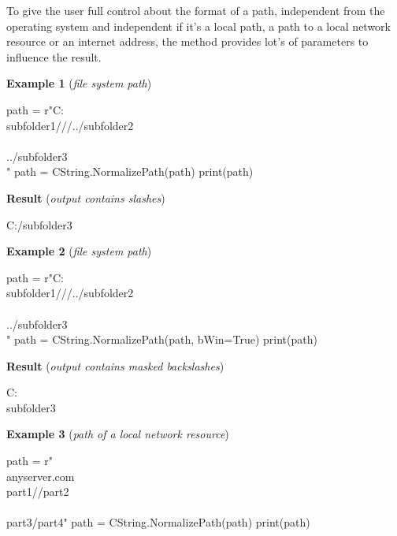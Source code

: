 To give the user full control about the format of a path, independent from the operating system and independent if it's
a local path, a path to a local network resource or an internet address, the method  provides
lot's of parameters to influence the result.

\vspace{1ex}

\textbf{Example 1} (\textit{file system path})

\begin{pythoncode}
path = r"C:\\subfolder1///../subfolder2\\\\../subfolder3\\"
path = CString.NormalizePath(path)
print(path)
\end{pythoncode}

\textbf{Result} (\textit{output contains slashes})

\begin{robotlog}
C:/subfolder3
\end{robotlog}

\vspace{1ex}

\textbf{Example 2} (\textit{file system path})

\begin{pythoncode}
path = r"C:\\subfolder1///../subfolder2\\\\../subfolder3\\"
path = CString.NormalizePath(path, bWin=True)
print(path)
\end{pythoncode}

\textbf{Result} (\textit{output contains masked backslashes})

\begin{robotlog}
C:\\subfolder3
\end{robotlog}

\vspace{1ex}

\textbf{Example 3} (\textit{path of a local network resource})

\begin{pythoncode}
path = r"\\anyserver.com\\part1//part2\\\\part3/part4"
path = CString.NormalizePath(path)
print(path)
\end{pythoncode}

